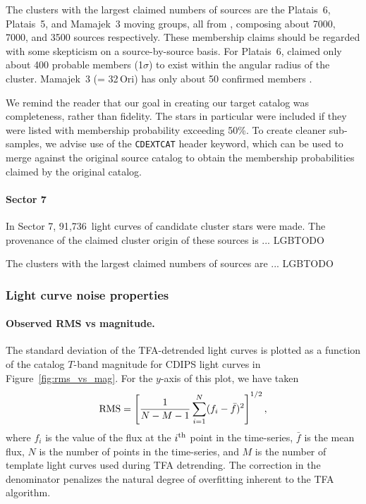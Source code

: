 \documentclass[12pt,twocolumn,tighten]{aastex62}
\newcommand{\sVIInumberlcs}{91{,}736\ }  %
\begin{document}
The clusters with the largest claimed numbers of sources are the
Platais~6, Platais~5, and Mamajek~3 moving groups, all from
\citet{dias_proper_2014}, composing about 7000, 7000, and 3500 sources
respectively. These membership claims should be regarded with some
skepticism on a source-by-source basis.  For Platais~6,
\citet{Kharchenko_et_al_2013} claimed only about 400 probable members
(1$\sigma$) to exist within the angular radius of the cluster.
Mamajek~3 (= 32$\,$Ori) has only about 50 confirmed members
\citep{bell_32ori_2017}.

We remind the reader that our goal in creating our target catalog was
completeness, rather than fidelity. The \citet{dias_proper_2014} stars
in particular were included if they were listed with membership
probability exceeding 50\%.  To create cleaner sub-samples, we advise
use of the \texttt{CDEXTCAT} header keyword, which can be used to
merge against the original source catalog to obtain the membership
probabilities claimed by the original catalog.

\paragraph{Sector 7}
In Sector 7, \sVIInumberlcs light curves of candidate cluster stars
were made. The provenance of the claimed cluster origin of these
sources is  ... LGBTODO

The clusters with the largest claimed numbers of sources are ...
LGBTODO

\subsubsection{Light curve noise properties}
\label{subsubsec:rmsvsmag}

\paragraph{Observed RMS vs magnitude.}
The standard deviation of the TFA-detrended light curves is plotted as
a function of the catalog $T$-band magnitude for CDIPS light curves in
Figure~\ref{fig:rms_vs_mag}.
For the $y$-axis of this plot, we have taken
\begin{equation}
  {\rm RMS} = \left[
    \frac{1}{N-M-1}
    \sum_{i=1}^{N} (f_i - \bar{f})^2
  \right]^{1/2},
\end{equation}
where $f_i$ is the value of the flux at the $i^{\rm th}$ point in the
time-series, $\bar{f}$ is the mean flux, $N$ is the
number of points in the time-series, and $M$ is the number
of template light curves used during TFA detrending.
The correction in the denominator penalizes the natural degree of
overfitting inherent to the TFA algorithm.
\end{document}
